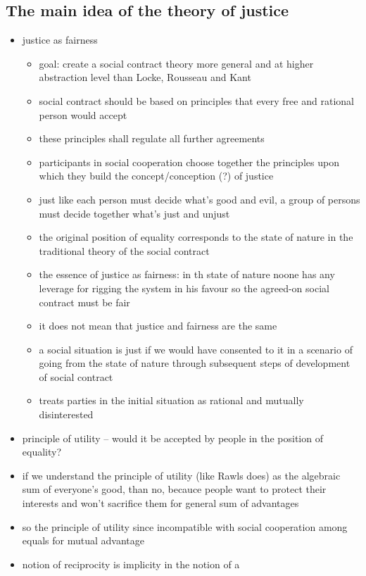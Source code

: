 \subsection{The main idea of the theory of justice}
\begin{itemize}
	\item justice as fairness
	\begin{itemize}
		\item goal: create a social contract theory more general and at
		higher abstraction level than Locke, Rousseau and Kant
		\item social contract should be based on principles that every
		free and rational person would accept
		\item these principles shall regulate all further agreements
		\item participants in social cooperation choose together the
		principles upon which they build the concept/conception (?) of
		justice
		\item just like each person must decide what's good and evil,
		a group of persons must decide together what's just and unjust
		\item the original position of equality corresponds to the
		state of nature in the traditional theory of the social
		contract
		\item the essence of justice as fairness: in th state of nature
		noone has any leverage for rigging the system in his favour so
		the agreed-on social contract must be fair
		\item it does not mean that justice and fairness are the same
		\item a social situation is just if we would have consented to
		it in a scenario of going from the state of nature through
		subsequent steps of development of social contract
		\item treats parties in the initial situation as rational and
		mutually disinterested
	\end{itemize}
	\item principle of utility -- would it be accepted by people in the
	position of equality?
	\item if we understand the principle of utility (like Rawls does) as
	the algebraic sum of everyone's good, than no, becauce people want to
	protect their interests and won't sacrifice them for general sum of
	advantages
	\item so the principle of utility since incompatible with social
	cooperation among equals for mutual advantage
	\item notion of reciprocity is implicity in the notion of a 

\end{itemize}
